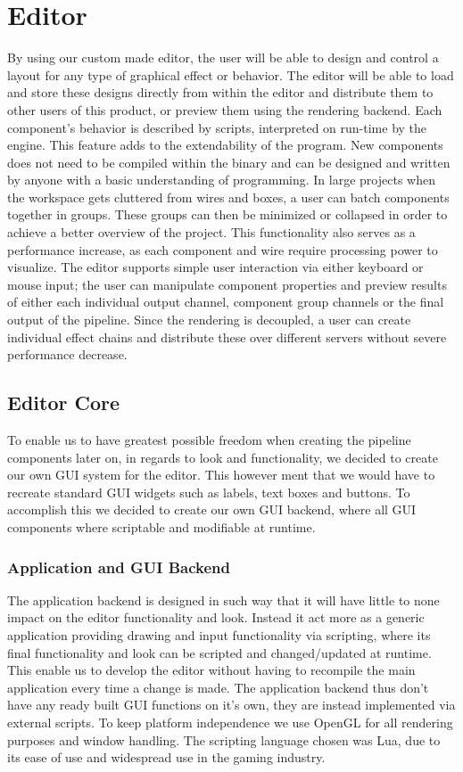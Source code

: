
\chapter{Editor}
 
By using our custom made editor, the user will be able to design and control a layout for any type of graphical effect or behavior. The editor will be able to load and store these designs directly from within the editor and distribute them to other users of this product, or preview them using the rendering backend. 
Each component’s behavior is described by scripts, interpreted on run-time by the engine. This feature adds to the extendability of the program. New components does not need to be compiled within the binary and can be designed and written by anyone with a basic understanding of programming.
In large projects when the workspace gets cluttered from wires and boxes, a user can batch components together in groups. These groups can then be minimized or collapsed in order to achieve a better overview of the project. This functionality also serves as a performance increase, as each component and wire require processing power to visualize. 
The editor supports simple user interaction via either keyboard or mouse input; the user can manipulate component properties and preview results of either each individual output channel, component group channels or the final output of the pipeline. Since the rendering is decoupled, a user can create individual effect chains and distribute these over different servers without severe performance decrease. 

\section{Editor Core}
To enable us to have greatest possible freedom when creating the pipeline components later on, in regards to look and functionality, we decided to create our own GUI system for the editor. This however ment that we would have to recreate standard GUI widgets such as labels, text boxes and buttons. To accomplish this we decided to create our own GUI backend, where all GUI components where scriptable and modifiable at runtime.

\subsection{Application and GUI Backend}
The application backend is designed in such way that it will have little to none impact on the editor functionality and look. Instead it act more as a generic application providing drawing and input functionality via scripting, where its final functionality and look can be scripted and changed/updated at runtime. This enable us to develop the editor without having to recompile the main application every time a change is made. The application backend thus don't have any ready built GUI functions on it's own, they are instead implemented via external scripts. To keep platform independence we use OpenGL for all rendering purposes and window handling. The scripting language chosen was Lua, due to its ease of use and widespread use in the gaming industry.

